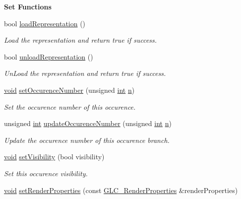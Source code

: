 \begin{Indent}{\bf Set Functions}
\begin{DoxyCompactItemize}
bool \hyperlink{class_g_l_c___struct_occurence_a0741a47957aa94ff4473be70c6524b6f}{load\-Representation} ()
\begin{DoxyCompactList}\small\item\em Load the representation and return true if success. \end{DoxyCompactList}\item 
bool \hyperlink{class_g_l_c___struct_occurence_aa79c7c12010247da816ac7ff942333c7}{unload\-Representation} ()
\begin{DoxyCompactList}\small\item\em Un\-Load the representation and return true if success. \end{DoxyCompactList}\item 
\hyperlink{group___u_a_v_objects_plugin_ga444cf2ff3f0ecbe028adce838d373f5c}{void} \hyperlink{class_g_l_c___struct_occurence_a4a267def7b328ae08cddc27cb529c7a2}{set\-Occurence\-Number} (unsigned \hyperlink{ioapi_8h_a787fa3cf048117ba7123753c1e74fcd6}{int} \hyperlink{glext_8h_a4eacae1d9e7c39f8236bb36d4ececa77}{n})
\begin{DoxyCompactList}\small\item\em Set the occurence number of this occurence. \end{DoxyCompactList}\item 
unsigned \hyperlink{ioapi_8h_a787fa3cf048117ba7123753c1e74fcd6}{int} \hyperlink{class_g_l_c___struct_occurence_abec3d1fdb455e51001362c480024b104}{update\-Occurence\-Number} (unsigned \hyperlink{ioapi_8h_a787fa3cf048117ba7123753c1e74fcd6}{int} \hyperlink{glext_8h_a4eacae1d9e7c39f8236bb36d4ececa77}{n})
\begin{DoxyCompactList}\small\item\em Update the occurence number of this occurence branch. \end{DoxyCompactList}\item 
\hyperlink{group___u_a_v_objects_plugin_ga444cf2ff3f0ecbe028adce838d373f5c}{void} \hyperlink{class_g_l_c___struct_occurence_a1beaa79919aaccbb61ab72cc86195451}{set\-Visibility} (bool visibility)
\begin{DoxyCompactList}\small\item\em Set this occurence visibility. \end{DoxyCompactList}\item 
\hyperlink{group___u_a_v_objects_plugin_ga444cf2ff3f0ecbe028adce838d373f5c}{void} \hyperlink{class_g_l_c___struct_occurence_a5cd7378dc05bd6a6f0a758ef29722447}{set\-Render\-Properties} (const \hyperlink{class_g_l_c___render_properties}{G\-L\-C\-\_\-\-Render\-Properties} \&render\-Properties)

\end{DoxyCompactItemize}
\end{Indent}
